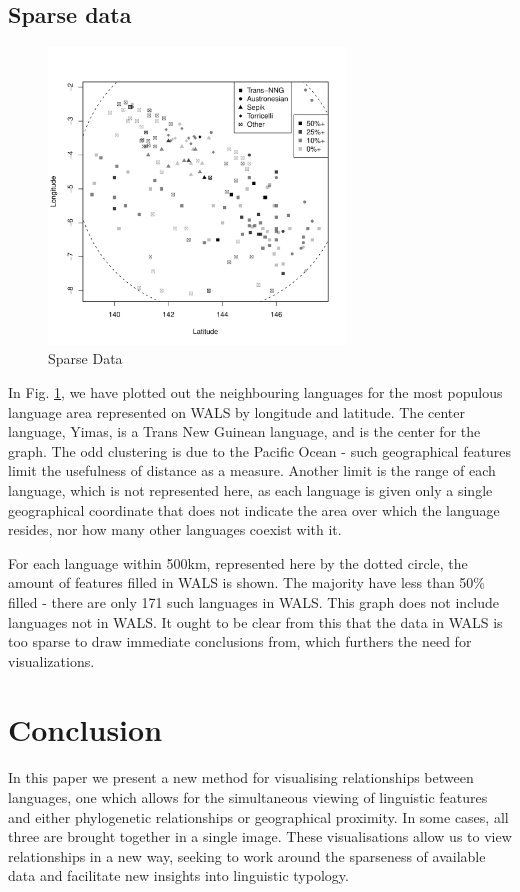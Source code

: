 \documentclass[11pt]{article}
\begin{document}
\subsection{Sparse data}


\begin{figure}[h]
\includegraphics[width=3.1in]
{graph1sparse.pdf} 
\caption{Sparse Data} 
\label{fig:sparse} 
\end{figure}

In Fig. \ref{fig:sparse}, we have plotted out the neighbouring languages for the most populous language area represented on WALS by longitude and latitude. The center language, Yimas, is a Trans New Guinean language, and is the center for the graph. The odd clustering is due to the Pacific Ocean - such geographical features limit the usefulness of distance as a measure. Another limit is the range of each language, which is not represented here, as each language is given only a single geographical coordinate that does not indicate the area over which the language resides, nor how many other languages coexist with it.

For each language within 500km, represented here by the dotted circle, the amount of features filled in WALS is shown. The majority have less than 50\% filled - there are only 171 such languages in WALS. This graph does not include languages not in WALS. It ought to be clear from this that the data in WALS is too sparse to draw immediate conclusions from, which furthers the need for visualizations. 


\section{Conclusion}
In this paper we present a new method for visualising relationships between languages, one which allows for the simultaneous viewing of linguistic features and either phylogenetic relationships or geographical proximity. In some cases, all three are brought together in a single image. These visualisations allow us to view relationships in a new way, seeking to work around the sparseness of available data and facilitate new insights into linguistic typology.
\end{document}
